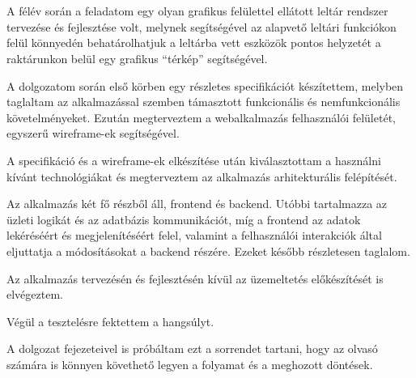 \chapter{\bevezetes}

A félév során a feladatom egy olyan grafikus felülettel ellátott leltár rendszer tervezése és fejlesztése volt, melynek segítségével az alapvető leltári funkciókon felül könnyedén behatárolhatjuk a leltárba vett eszközök pontos helyzetét a raktárunkon belül egy grafikus “térkép” segítségével.

A dolgozatom során első körben egy részletes specifikációt készítettem, melyben taglaltam az alkalmazással szemben támasztott funkcionális és nemfunkcionális követelményeket.
Ezután megterveztem a webalkalmazás felhasználói felületét, egyszerű wireframe-ek segítségével.

A specifikáció és a wireframe-ek elkészítése után kiválasztottam a használni kívánt technológiákat és megterveztem az alkalmazás arhitekturális felépítését.

Az alkalmazás két fő részből áll, frontend és backend. Utóbbi tartalmazza az üzleti logikát és az adatbázis kommunikációt, míg a frontend az adatok lekéréséért és megjelenítéséért felel, valamint a felhasználói interakciók által eljuttatja a módosításokat a backend részére.
Ezeket később részletesen taglalom.

Az alkalmazás tervezésén és fejlesztésén kívül az üzemeltetés előkészítését is elvégeztem.

Végül a tesztelésre fektettem a hangsúlyt. 

A dolgozat fejezeteivel is próbáltam ezt a sorrendet tartani, hogy az olvasó számára is könnyen követhető legyen a folyamat és a meghozott döntések.